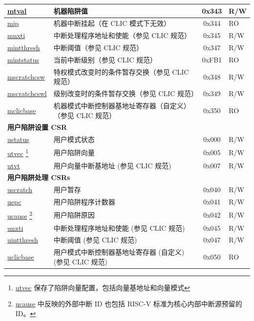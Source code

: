 \begin{longtable}{ | p{4.0cm} | p{8.4cm} | c | l | }
\hyperref[regdesc:MTVAL]{mtval} & 机器陷阱值 & 0x343 & R/W \\\hline
\hyperref[regdesc:MIP_REG]{mip} & 机器中断挂起（在 CLIC 模式下无效） & 0x344 & RO \\\hline
\hyperref[regdesc:MNXTI_REG]{mnxti} & 中断处理程序地址和使能（参见 CLIC 规范） & 0x345 & R/W \\\hline
\hyperref[regdesc:MINTTHRESH]{mintthresh} & 中断阈值（参见 CLIC 规范） & 0x347 & R/W \\\hline
\hyperref[regdesc:MINTSTATUS]{mintstatus} & 当前中断级别（参见 CLIC 规范） & 0xFB1 & RO \\\hline
\hyperref[regdesc:MSCRATCHCSW_REG]{mscratchcsw} & 特权模式改变时的条件暂存交换（参见 CLIC 规范） & 0x348 & R/W \\\hline
\hyperref[regdesc:MSCRATCHCSWL_REG]{mscratchcswl} & 级别改变时的条件暂存交换（参见 CLIC 规范） & 0x349 & R/W \\\hline
\hyperref[regdesc:MCLICBASE_REG]{mclicbase} & 机器模式中断控制器基地址寄存器（自定义）（参见 CLIC 规范） & 0x350 & RO \\\hline
\multicolumn{4}{|l|}{\textbf{用户陷阱设置 CSR}} \\\hline
\hyperref[regdesc:USTATUS]{ustatus} & 用户模式状态 & 0x000 & R/W \\\hline
\hyperref[regdesc:UTVEC]{utvec} \footnote{\hyperref[regdesc:UTVEC]{utvec} 保存了陷阱向量配置，包括向量基地址和向量模式} & 用户陷阱向量 & 0x005 & R/W \\\hline
\hyperref[regdesc:UTVT]{utvt} & 用户向量中断基地址 (参见 CLIC 规范) & 0x007 & R/W \\\hline
\multicolumn{4}{|l|}{\textbf{用户陷阱处理 CSRs}} \\\hline
\hyperref[regdesc:USCRATCH]{uscratch} & 用户暂存 & 0x040 & R/W \\\hline
\hyperref[regdesc:UEPC]{uepc} & 用户陷阱程序计数器 & 0x041 & R/W \\\hline
\hyperref[regdesc:UCAUSE]{ucause} \footnote{\hyperref[regdesc:UCAUSE]{ucause} 中反映的外部中断 ID 也包括 RISC-V 标准为核心内部中断源预留的 ID。} & 用户陷阱原因 & 0x042 & R/W \\\hline
\hyperref[regdesc:UNXTI_REG]{unxti} & 中断处理程序地址和使能 (参见 CLIC 规范) & 0x045 & R/W \\\hline
\hyperref[regdesc:UINTTHRESH]{uintthresh} & 中断阈值 (参见 CLIC 规范) & 0x047 & R/W \\\hline
\hyperref[regdesc:UCLICBASE_REG]{uclicbase} & 用户模式中断控制器基地址寄存器 (自定义) (参见 CLIC 规范) & 0x050 & RO \\\hline

\end{longtable}
